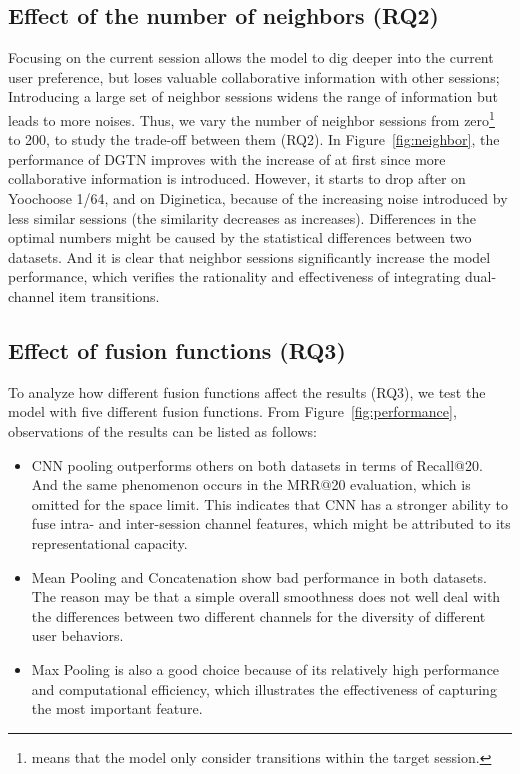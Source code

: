 \documentclass[conference]{IEEEtran}
\begin{document}
\subsection{Effect of the number of neighbors (RQ2)}
Focusing on the current session  allows the model to dig deeper into the current user preference, but loses valuable collaborative information with other sessions; Introducing a large set of neighbor sessions  widens the range of information but leads to more noises. Thus, we vary the number of neighbor sessions  from zero\footnote{ means that the model only consider transitions within the target session.} to 200, to study the trade-off between them (RQ2). In Figure~\ref{fig:neighbor}, the performance of DGTN improves with the increase of  at first since more collaborative information is introduced. However, it starts to drop after  on Yoochoose 1/64, and  on Diginetica, because of the increasing noise introduced by less similar sessions (the similarity decreases as  increases). Differences in the optimal numbers might be caused by the statistical differences between two datasets. And it is clear that neighbor sessions significantly increase the model performance, which verifies the rationality and effectiveness of integrating dual-channel item transitions.








\subsection{Effect of fusion functions (RQ3)}
To analyze how different fusion functions affect the results (RQ3), we test the model with five different fusion functions. From Figure~\ref{fig:performance}, observations of the results can be listed as follows:
\begin{itemize}
    \item {CNN pooling outperforms others on both datasets in terms of Recall@20. And the same phenomenon occurs in the MRR@20 evaluation, which is omitted for the space limit. This indicates that CNN has a stronger ability to fuse intra- and inter-session channel features, which might be attributed to its representational capacity.}
    \item {Mean Pooling and Concatenation show bad performance in both datasets. The reason may be that a simple overall smoothness does not well deal with the differences between two different channels for the diversity of different user behaviors.}
    \item {Max Pooling is also a good choice because of its relatively high performance and computational efficiency, which illustrates the effectiveness of capturing the most important feature.}
\end{itemize}
\end{document}
